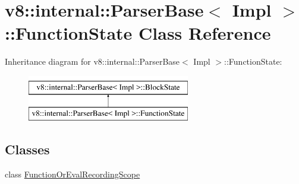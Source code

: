 \hypertarget{classv8_1_1internal_1_1ParserBase_1_1FunctionState}{}\section{v8\+:\+:internal\+:\+:Parser\+Base$<$ Impl $>$\+:\+:Function\+State Class Reference}
\label{classv8_1_1internal_1_1ParserBase_1_1FunctionState}
Inheritance diagram for v8\+:\+:internal\+:\+:Parser\+Base$<$ Impl $>$\+:\+:Function\+State\+:\begin{figure}[H]
\begin{center}
\leavevmode
\includegraphics[height=2.000000cm]{classv8_1_1internal_1_1ParserBase_1_1FunctionState}
\end{center}
\end{figure}
\subsection*{Classes}
\begin{DoxyCompactItemize}
\item 
class \mbox{\hyperlink{classv8_1_1internal_1_1ParserBase_1_1FunctionState_1_1FunctionOrEvalRecordingScope}{Function\+Or\+Eval\+Recording\+Scope}}
\end{DoxyCompactItemize}
